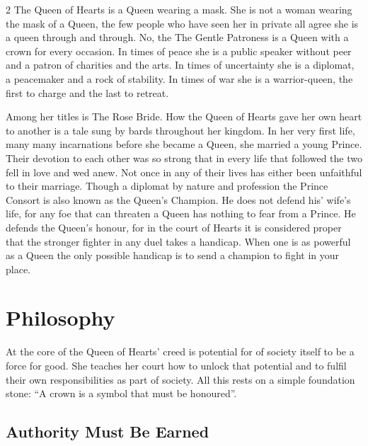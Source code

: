 \begin{multicols}{2}
The Queen of Hearts is a Queen wearing a mask. She is not a woman wearing the mask of a Queen, the few people who have seen her in private all agree she is a queen through and through. No, the The Gentle Patroness is a Queen with a crown for every occasion. In times of peace she is a public speaker without peer and a patron of charities and the arts. In times of uncertainty she is a diplomat, a peacemaker and a rock of stability. In times of war she is a warrior-queen, the first to charge and the last to retreat.

Among her titles is The Rose Bride. How the Queen of Hearts gave her own heart to another is a tale sung by bards throughout her kingdom. In her very first life, many many incarnations before she became a Queen, she married a young Prince. Their devotion to each other was so strong that in every life that followed the two fell in love and wed anew. Not once in any of their lives has either been unfaithful to their marriage. Though a diplomat by nature and profession the Prince Consort is also known as the Queen's Champion. He does not defend his' wife's life, for any foe that can threaten a Queen has nothing to fear from a Prince. He defends the Queen's honour, for in the court of Hearts it is considered proper that the stronger fighter in any duel takes a handicap. When one is as powerful as a Queen the only possible handicap is to send a champion to fight in your place.

\section*{Philosophy}

At the core of the Queen of Hearts' creed is potential for of society itself to be a force for good. She teaches her court how to unlock that potential and to fulfil their own responsibilities as part of society. All this rests on a simple foundation stone: \textquotedblleft A crown is a symbol that must be honoured\textquotedblright .

\subsection*{Authority Must Be Earned}


\end{multicols}

